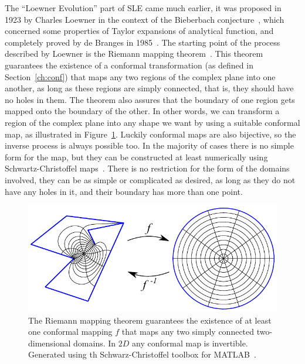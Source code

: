 The ``Loewner Evolution'' part of SLE came much earlier, it was proposed in
1923 by Charles Loewner in the context of the Bieberbach
conjecture~\cite{Loewner1923}, which concerned some properties of Taylor
expansions of analytical function, and completely proved by de Branges in
1985~\cite{DeBranges1985}. The starting point of the process described by
Loewner is the Riemann mapping theorem~\cite{Ahlfors1979}. This theorem
guarantees the existence of a conformal transformation (as defined in
Section~\ref{ch:conf}) that maps any two regions of the complex plane into one
another, as long as these regions are simply connected, that is, they should
have no holes in them. The theorem also assures that the boundary of one region
gets mapped onto the boundary of the other. In other words, we can transform a
region of the complex plane into any shape we want by using a suitable
conformal map, as illustrated in Figure~\ref{fig:scmap}. Luckily conformal maps
are also bijective, so the inverse process is always possible too. In the
majority of cases there is no simple form for the map, but they can be
constructed at least numerically using Schwartz-Christoffel
maps~\cite{Driscoll2002}. There is no restriction for the form of the domains
involved, they can be as simple or complicated as desired, as long as they do
not have any holes in it, and their boundary has more than one point.

\begin{figure}[t]
\begin{center}
    \includegraphics[scale=1.0]{chapters/ch4-sle/figs/scmap}
\end{center}
\caption{The Riemann mapping theorem guarantees the existence of at least one
    conformal mapping $f$ that maps any two simply connected two-dimensional
    domains. In $2D$ any conformal map is invertible. Generated using th
    Schwarz-Christoffel toolbox for MATLAB~\cite{Driscoll2005}.}
\label{fig:scmap}
\end{figure}


